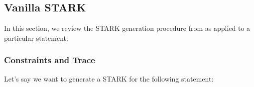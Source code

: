 \subsection{Vanilla STARK}\label{sec:vanilla-STARK}

In this section, we review the STARK generation procedure from \cite{EPRINT:StarkWare21} as applied to a particular statement.
\subsubsection*{Constraints and Trace}

Let's say we want to generate a STARK for the following statement: \\[0.2cm]
 \\[0.2cm]

